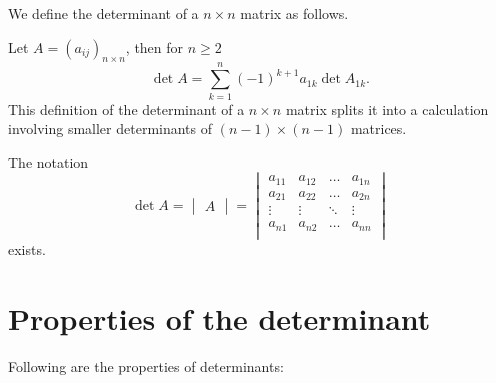 We define the determinant of a $n\times n$ matrix as follows.

Let $A=(a_{ij})_{n\times n}$, then for $n\geq2$
\[
    \det{A}=\sum_{k=1}^n{(-1)^{k+1}a_{1k}\det{A_{1k}}}.
\]
This definition of the determinant of a $n\times n$ matrix splits it into a calculation involving smaller determinants of $(n-1)\times(n-1)$ matrices. 

\begin{remark}
    The notation
    \[
        \det{A}=
        \begin{vmatrix}
            A
        \end{vmatrix}
        =
        \begin{vmatrix}
            a_{11}&a_{12}&\ldots&a_{1n}\\
            a_{21}&a_{22}&\ldots&a_{2n}\\
            \vdots&\vdots&\ddots&\vdots\\
            a_{n1}&a_{n2}&\ldots&a_{nn}\\
            
        \end{vmatrix}
    \]
    exists.
\end{remark}

\section{Properties of the determinant}

Following are the properties of determinants:

